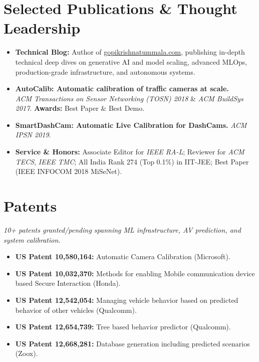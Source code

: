 \documentclass[10pt,letterpaper]{article}
\begin{document}
\section{Selected Publications \& Thought Leadership}
\begin{itemize}
    \item \textbf{Technical Blog:} Author of \href{https://gopikrishnatummala.com/}{gopikrishnatummala.com}, publishing in-depth technical deep dives on generative AI and model scaling, advanced MLOps, production-grade infrastructure, and autonomous systems.
    \item \textbf{AutoCalib: Automatic calibration of traffic cameras at scale.} \\
    \textit{ACM Transactions on Sensor Networking (TOSN) 2018} \& \textit{ACM BuildSys 2017}. \textbf{Awards:} Best Paper \& Best Demo.
    \item \textbf{SmartDashCam: Automatic Live Calibration for DashCams.} \textit{ACM IPSN 2019}.
    \item \textbf{Service \& Honors:} Associate Editor for \textit{IEEE RA-L}; Reviewer for \textit{ACM TECS}, \textit{IEEE TMC}; All India Rank 274 (Top 0.1\%) in IIT-JEE; Best Paper (IEEE INFOCOM 2018 MiSeNet).
\end{itemize}

\section{Patents}
\textit{10+ patents granted/pending spanning ML infrastructure, AV prediction, and system calibration.}
\begin{itemize}
    \item \textbf{US Patent 10,580,164:} Automatic Camera Calibration (Microsoft).
    \item \textbf{US Patent 10,032,370:} Methods for enabling Mobile communication device based Secure Interaction (Honda).
    \item \textbf{US Patent 12,542,054:} Managing vehicle behavior based on predicted behavior of other vehicles (Qualcomm).
    \item \textbf{US Patent 12,654,739:} Tree based behavior predictor (Qualcomm).
    \item \textbf{US Patent 12,668,281:} Database generation including predicted scenarios (Zoox).
\end{itemize}
\end{document}
